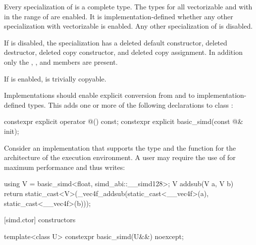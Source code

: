 \pnum
Every specialization of  is a complete type.
The types  for all vectorizable
 and with  in the range of  are enabled.
It is implementation-defined whether any other  specialization
with vectorizable  is enabled.
Any other specialization of  is disabled.

If  is disabled, the specialization has a
deleted default constructor, deleted destructor, deleted copy constructor, and
deleted copy assignment.
In addition only the , , and
 members are present.

If  is enabled,  is
trivially copyable.

\pnum\recommended
Implementations should enable explicit conversion from and to
implementation-defined types. This adds one or more of the following
declarations to class :

\begin{codeblock}
constexpr explicit operator @\impdef@() const;
constexpr explicit basic_simd(const @\impdef@& init);
\end{codeblock}

\begin{example}
  Consider an implementation that supports the type  and the function  for the architecture of the execution environment.
  A user may require the use of  for maximum performance and thus writes:
  \begin{codeblock}
    using V = basic_simd<float, simd_abi::__simd128>;
    V addsub(V a, V b) {
      return static_cast<V>(_vec4f_addsub(static_cast<__vec4f>(a), static_cast<__vec4f>(b)));
    }
  \end{codeblock}
\end{example}


[simd.ctor]{ constructors}

\begin{itemdecl}
template<class U> constexpr basic_simd(U&&) noexcept;
\end{itemdecl}

